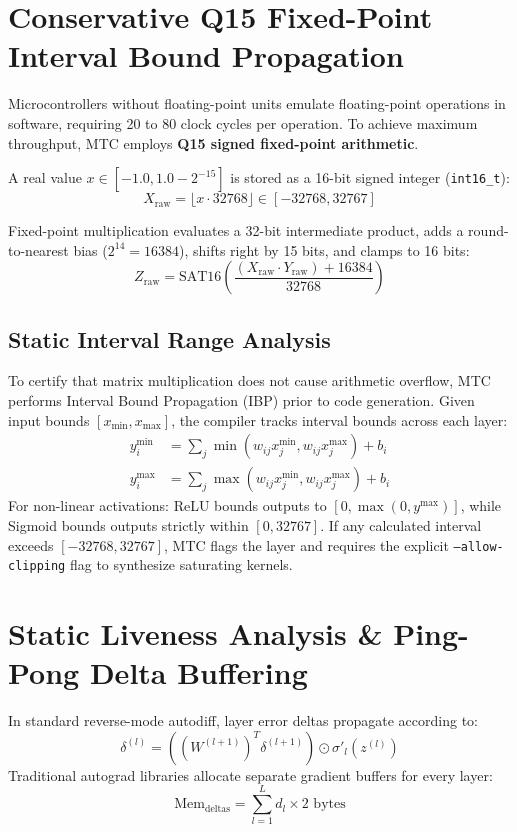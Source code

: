 \documentclass[12pt,a4paper]{report}
\begin{document}
\section{Conservative Q15 Fixed-Point Interval Bound Propagation}
Microcontrollers without floating-point units emulate floating-point operations in software, requiring 20 to 80 clock cycles per operation. To achieve maximum throughput, MTC employs \textbf{Q15 signed fixed-point arithmetic}.

A real value $x \in [-1.0, 1.0 - 2^{-15}]$ is stored as a 16-bit signed integer (\texttt{int16\_t}):
\begin{equation}
    X_{\text{raw}} = \lfloor x \cdot 32768 \rfloor \in [-32768, 32767]
\end{equation}

Fixed-point multiplication evaluates a 32-bit intermediate product, adds a round-to-nearest bias ($2^{14} = 16384$), shifts right by 15 bits, and clamps to 16 bits:
\begin{equation}
    Z_{\text{raw}} = \text{SAT16}\left( \frac{(X_{\text{raw}} \cdot Y_{\text{raw}}) + 16384}{32768} \right)
\end{equation}

\subsection{Static Interval Range Analysis}
To certify that matrix multiplication does not cause arithmetic overflow, MTC performs Interval Bound Propagation (IBP) prior to code generation. Given input bounds $[x_{\min}, x_{\max}]$, the compiler tracks interval bounds across each layer:
\begin{align}
    y_i^{\min} &= \sum_j \min(w_{ij} x_j^{\min}, w_{ij} x_j^{\max}) + b_i \\
    y_i^{\max} &= \sum_j \max(w_{ij} x_j^{\min}, w_{ij} x_j^{\max}) + b_i
\end{align}
For non-linear activations: ReLU bounds outputs to $[0, \max(0, y^{\max})]$, while Sigmoid bounds outputs strictly within $[0, 32767]$. If any calculated interval exceeds $[-32768, 32767]$, MTC flags the layer and requires the explicit \texttt{--allow-clipping} flag to synthesize saturating kernels.

\section{Static Liveness Analysis \& Ping-Pong Delta Buffering}
In standard reverse-mode autodiff, layer error deltas propagate according to:
\begin{equation}
    \delta^{(l)} = \left(\left(W^{(l+1)}\right)^T \delta^{(l+1)}\right) \odot \sigma'_l\left(z^{(l)}\right)
    \label{eq:backprop}
\end{equation}
Traditional autograd libraries allocate separate gradient buffers for every layer:
\begin{equation}
    \text{Mem}_{\text{deltas}} = \sum_{l=1}^L d_l \times 2 \text{ bytes}
\end{equation}
\end{document}
